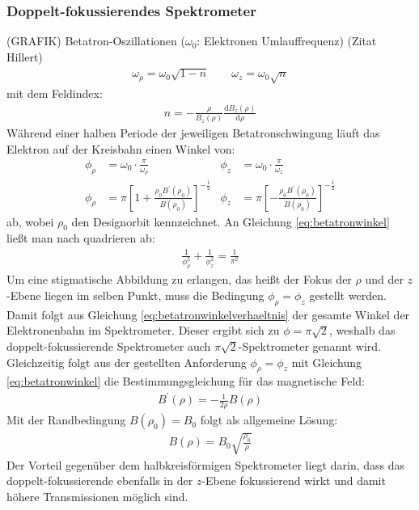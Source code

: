 \documentclass[11pt, a4paper]{article}
\numberwithin{equation}{section}
\begin{document}
\subsubsection{Doppelt-fokussierendes Spektrometer}
(GRAFIK)
Betatron-Oszillationen ($\omega_0$: Elektronen Umlauffrequenz) (Zitat Hillert)
\begin{align}
	\omega_\rho = \omega_0 \sqrt{1-n} \qquad \omega_z = \omega_0 \sqrt{n}
\end{align}
mit dem Feldindex:
\begin{align}
	n = - \frac{\rho}{B_z(\rho)} \frac{\mathrm{d} B_z(\rho)}{\mathrm{d} \rho}
\end{align}
Während einer halben Periode der jeweiligen Betatronschwingung läuft das Elektron auf der Kreisbahn einen Winkel von:
\begin{align}
	\phi_\rho &= \omega_0 \cdot \frac{\pi}{\omega_\rho} & \phi_z &= \omega_0 \cdot \frac{\pi}{\omega_z}\\
	\phi_\rho &= \pi \left[ 1+ \frac{\rho_0 B^\prime(\rho_0)}{B(\rho_0)} \right]^{-\frac{1}{2}} & \phi_z &= \pi \left[ -\frac{\rho_0 B^\prime(\rho_0)}{B(\rho_0)} \right]^{-\frac{1}{2}} \label{eq:betatronwinkel}
\end{align}
ab, wobei $\rho_0$ den Designorbit kennzeichnet.
An Gleichung \eqref{eq:betatronwinkel} ließt man nach quadrieren ab:
\begin{align}
	\frac{1}{\phi_\rho^2} + \frac{1}{\phi_z^2} = \frac{1}{\pi^2} \label{eq:betatronwinkelverhaeltnis}
\end{align}
Um eine stigmatische Abbildung zu erlangen, das heißt der Fokus der $\rho$ und der $z$-Ebene liegen im selben Punkt, muss die Bedingung $\phi_\rho = \phi_z$ gestellt werden.
Damit folgt aus Gleichung \eqref{eq:betatronwinkelverhaeltnis} der gesamte Winkel der Elektronenbahn im Spektrometer.
Dieser ergibt sich zu $\phi = \pi \sqrt{2}$, weshalb das doppelt-fokussierende Spektrometer auch $\pi \sqrt{2}$-Spektrometer genannt wird.
Gleichzeitig folgt aus der gestellten Anforderung $\phi_\rho = \phi_z$ mit Gleichung \eqref{eq:betatronwinkel} die Bestimmungsgleichung für das magnetische Feld:
\begin{align}
	B^\prime(\rho) = - \frac{1}{2 \rho} B(\rho)
\end{align}
Mit der Randbedingung $B(\rho_0) = B_0$ folgt als allgemeine Lösung:
\begin{align}
	B(\rho) = B_0 \sqrt{\frac{\rho_0}{\rho}}
\end{align}
Der Vorteil gegenüber dem halbkreisförmigen Spektrometer liegt darin, dass das doppelt-fokussierende ebenfalls in der $z$-Ebene fokussierend wirkt und damit höhere Transmissionen möglich sind.
\end{document}
